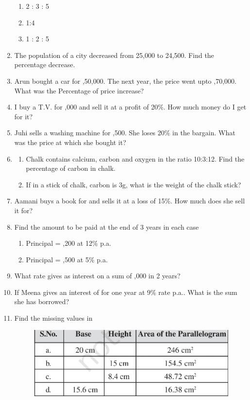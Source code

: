\begin{enumerate}[label=\thesection.\arabic*,ref=\thesection.\theenumi,resume*]
\begin{enumerate}
		\item  2 : 3 : 5 
		\item  1:4 
		\item  1 : 2 : 5
	\end{enumerate}
\item  The population of a city decreased from 25,000 to 24,500. Find the percentage decrease.
\item  Arun bought a car for ,50,000. The next year, the price went upto ,70,000. What was the Percentage of price increase?
\item  I buy a T.V. for ,000 and sell it at a profit of 20\%. How much money do I get for it?
\item  Juhi sells a washing machine for ,500. She loses 20\% in the bargain. What was the price at which she bought it?
\item 
	\begin{enumerate}
		\item Chalk contains calcium, carbon and oxygen in the ratio 10:3:12. Find the percentage of carbon in chalk.
		\item  If in a stick of chalk, carbon is 3g, what is the weight of the chalk stick?
	\end{enumerate}
\item Aamani buys a book for  and sells it at a loss of 15\%. How much does she sell it for?
\item  Find the amount to be paid at the end of 3 years in each case
	\begin{enumerate}
\item  Principal = ,200 at 12\% p.a.
\item  Principal = ,500 at 5\% p.a.
	\end{enumerate}
\item  What rate gives  as interest on a sum of ,000 in 2 years? 
\item  If Meena gives an interest of  for one year at 9\% rate p.a.. What is the sum she has borrowed?
\item	Find the missing values
	in
	\begin{figure}[H]
  \centering
  \includegraphics[width=\columnwidth]{figs/area.jpg}

\end{figure}
\end{enumerate}
